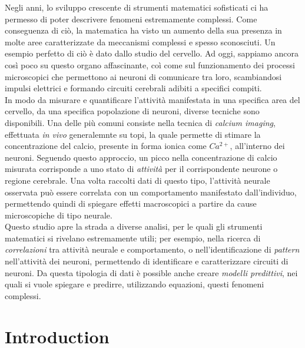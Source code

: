 \documentclass[12pt, a4paper]{report}
\begin{document}
Negli anni, lo sviluppo crescente di strumenti matematici sofisticati ci ha permesso di poter descrivere fenomeni estremamente complessi. Come conseguenza di ciò, la matematica ha visto un aumento della sua presenza in molte aree caratterizzate da meccanismi complessi e spesso sconosciuti. Un esempio perfetto di ciò è dato dallo studio del cervello. Ad oggi, sappiamo ancora così poco su questo organo affascinante, coì come sul funzionamento dei processi microscopici che permettono ai neuroni di comunicare tra loro, scambiandosi impulsi elettrici e formando circuiti cerebrali adibiti a specifici compiti.\\
In modo da misurare e quantificare l'attività manifestata in una specifica area del cervello, da una specifica popolazione di neuroni, diverse tecniche sono disponibili. Una delle più comuni consiste nella tecnica di \textit{calcium imaging}, effettuata \textit{in vivo} generalemnte su topi, la quale permette di stimare la concentrazione del calcio, presente in forma ionica come  $Ca^{2+}$, all'interno dei neuroni. Seguendo questo approccio, un picco nella concentrazione di calcio misurata corrisponde a uno stato di \textit{attività} per il corrispondente neurone o regione cerebrale. Una volta raccolti dati di questo tipo, l'attività neurale osservata può essere correlata con un comportamento manifestato dall'individuo, permettendo quindi di spiegare effetti macroscopici a partire da cause microscopiche di tipo neurale.\\
Questo studio apre la strada a diverse analisi, per le quali gli strumenti matematici si rivelano estremamente utili; per esempio, nella ricerca di \textit{correlazioni} tra attività neurale e comportamento, o nell'identificazione di \textit{pattern} nell'attività dei neuroni, permettendo di identificare e caratterizzare circuiti di neuroni. Da questa tipologia di dati è possible anche creare \textit{modelli predittivi}, nei quali si vuole spiegare e predirre, utilizzando equazioni, questi fenomeni complessi.	
		
	\chapter*{Introduction}
\end{document}

